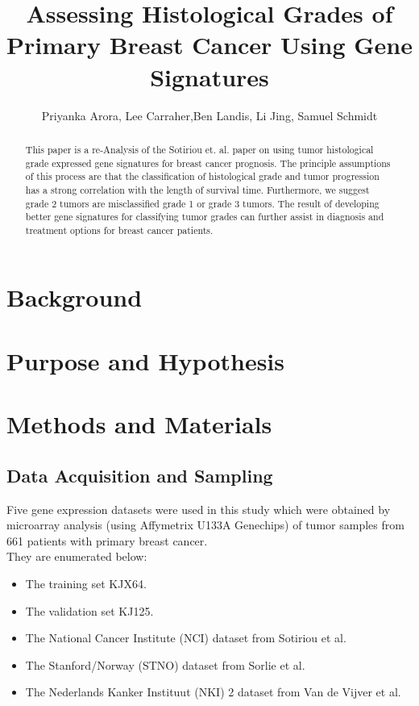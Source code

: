 \documentclass[a4paper,10pt]{article}
\title{Assessing Histological Grades of Primary Breast Cancer Using Gene Signatures}
\author{Priyanka Arora, Lee Carraher,Ben Landis, Li Jing, Samuel Schmidt}
\begin{document}
\maketitle

\begin{abstract}
This paper is a re-Analysis of the Sotiriou et. al. paper on using tumor 
histological grade expressed gene signatures for breast cancer 
prognosis\cite{Sotiriou}. The principle assumptions of this process are that
the classification of histological grade and tumor progression has a strong 
correlation with the length of survival time. Furthermore, we suggest grade 2
tumors are misclassified grade 1 or grade 3 tumors. The result of developing 
better gene signatures for classifying tumor grades can further
assist in diagnosis and treatment options for breast cancer patients.


\end{abstract}

\section{Background}
\section{Purpose and Hypothesis}
\section{Methods and Materials}
\subsection{Data Acquisition and Sampling}


Five gene expression datasets were used in this study which were obtained by
 microarray analysis (using  Affymetrix U133A Genechips) of tumor samples
 from 661 patients with primary breast cancer. \\
They are enumerated below:\\
\begin{itemize}
 \item The training set KJX64.
 \item The validation set KJ125.
 \item The National Cancer Institute (NCI) dataset from Sotiriou et al. \cite{Sotiriou1}
 \item The Stanford/Norway (STNO) dataset from Sorlie et al. \cite{Sorlie1}
 \item The Nederlands Kanker Instituut (NKI) 2 dataset from Van de Vijver et al. \cite{Vijver1}
\end{itemize}
\end{document}
